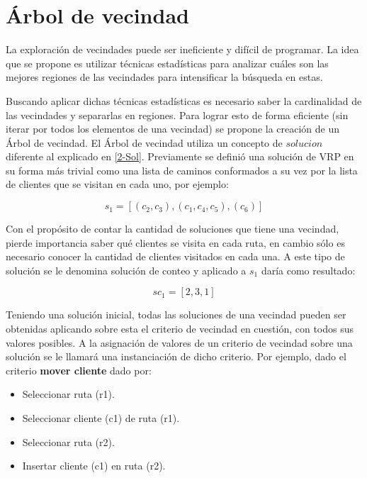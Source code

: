 \section{Árbol de vecindad}\label{2-Hector}
La exploración de vecindades puede ser ineficiente y difícil de programar. La idea que se propone es utilizar técnicas estadísticas para analizar cuáles son las mejores regiones de las vecindades para intensificar la búsqueda en estas.

Buscando aplicar dichas técnicas estadísticas es necesario saber la cardinalidad de las vecindades y separarlas en regiones. Para lograr esto de forma eficiente (sin iterar por todos los elementos de una vecindad) se propone la creación de un Árbol de vecindad. El Árbol de vecindad utiliza un concepto de $solucion$ diferente al explicado en \ref{2-Sol}. Previamente se definió una solución de VRP en su forma más trivial como una lista de caminos conformados a su vez por la lista de clientes que se visitan en cada uno, por ejemplo:

\begin{equation}
s_1 = [(c_2,c_3), (c_1,c_4,c_5), (c_6)]
\end{equation}

Con el propósito de contar la cantidad de soluciones que tiene una vecindad, pierde importancia saber qué clientes se visita en cada ruta, en cambio sólo es necesario conocer la cantidad de clientes visitados en cada una. A este tipo de solución se le denomina solución de conteo y aplicado a $s_1$ daría como resultado:

\begin{equation}
sc_1 = [2, 3, 1]
\end{equation}

Teniendo una solución inicial, todas las soluciones de una vecindad pueden ser obtenidas aplicando sobre esta el criterio de vecindad en cuestión, con todos sus valores posibles. A la asignación de valores de un criterio de vecindad sobre una solución se le llamará una instanciación de dicho criterio. Por ejemplo, dado el criterio \textbf{mover cliente} dado por: 

\begin{itemize}
	\item Seleccionar ruta (r1).
	\item Seleccionar cliente (c1) de ruta (r1).
	\item Seleccionar ruta (r2).
	\item Insertar cliente (c1) en ruta (r2).
\end{itemize}

